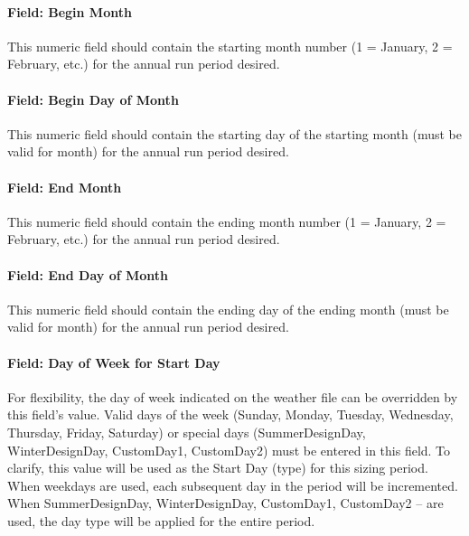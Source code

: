 \paragraph{Field: Begin Month}\label{field-begin-month}

This numeric field should contain the starting month number (1 = January, 2 = February, etc.) for the annual run period desired.

\paragraph{Field: Begin Day of Month}\label{field-begin-day-of-month}

This numeric field should contain the starting day of the starting month (must be valid for month) for the annual run period desired.

\paragraph{Field: End Month}\label{field-end-month}

This numeric field should contain the ending month number (1 = January, 2 = February, etc.) for the annual run period desired.

\paragraph{Field: End Day of Month}\label{field-end-day-of-month}

This numeric field should contain the ending day of the ending month (must be valid for month) for the annual run period desired.

\paragraph{Field: Day of Week for Start Day}\label{field-day-of-week-for-start-day}

For flexibility, the day of week indicated on the weather file can be overridden by this field's value. Valid days of the week (Sunday, Monday, Tuesday, Wednesday, Thursday, Friday, Saturday) or special days (SummerDesignDay, WinterDesignDay, CustomDay1, CustomDay2) must be entered in this field. To clarify, this value will be used as the Start Day (type) for this sizing period. When weekdays are used, each subsequent day in the period will be incremented. When SummerDesignDay, WinterDesignDay, CustomDay1, CustomDay2 -- are used, the day type will be applied for the entire period.

